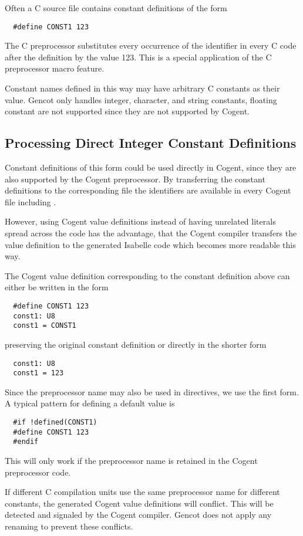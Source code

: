 Often a C source file contains constant definitions of the form
\begin{verbatim}
  #define CONST1 123
\end{verbatim}
The C preprocessor substitutes every occurrence of the identifier  in every C code after the definition 
by the value 123. This is a special application of the C preprocessor macro feature.

Constant names defined in this way may have arbitrary C constants as their value. Gencot only handles integer,
character, and string constants, floating constant are not supported since they are not supported by Cogent.

\subsection{Processing Direct Integer Constant Definitions}

Constant definitions of this form could be used directly in Cogent, since they are also supported by the Cogent preprocessor.
By transferring the constant definitions to the corresponding file  the identifiers are available
in every Cogent file including . 

However, using Cogent value definitions instead of having unrelated literals spread across the code has the advantage,
that the Cogent compiler transfers the value definition to the generated Isabelle code which becomes more readable this way. 

The Cogent value definition corresponding to the constant definition above can either be written in the form
\begin{verbatim}
  #define CONST1 123
  const1: U8
  const1 = CONST1
\end{verbatim}
preserving the original constant definition or directly in the shorter form
\begin{verbatim}
  const1: U8
  const1 = 123
\end{verbatim}
Since the preprocessor name  may also be used in  directives, we use the first form. A typical pattern 
for defining a default value is
\begin{verbatim}
  #if !defined(CONST1)
  #define CONST1 123
  #endif
\end{verbatim}
This will only work if the preprocessor name is retained in the Cogent preprocessor code.

If different C compilation units use the same preprocessor name for different constants, the generated Cogent value definitions
will conflict. This will be detected and signaled by the Cogent compiler. Gencot does not apply any renaming to prevent these
conflicts.

